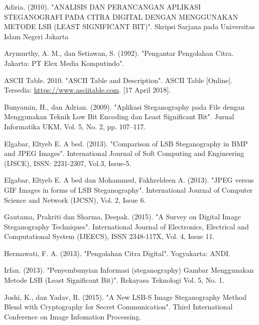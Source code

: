 \documentclass{jtetiskripsi}
\begin{document}
%
\begin{thebibliography}{99}
	Adiria. (2010). "ANALISIS DAN PERANCANGAN APLIKASI STEGANOGRAFI PADA CITRA DIGITAL DENGAN MENGGUNAKAN METODE LSB (LEAST SIGNIFICANT BIT)". Skripsi Sarjana pada Universitas Islam Negeri Jakarta
	
	Arymurthy, A. M., dan Setiawan, S. (1992). "Pengantar Pengolahan Citra. Jakarta: PT Elex Media Komputindo".
	
	 ASCII Table.  2010. "ASCII Table and Description".  ASCII Table [Online]. Tersedia: \url{https://www.asciitable.com}. [17 April 2018].
	
	Bunyamin, H., dan Adrian. (2009). "Aplikasi Steganography pada File dengan Menggunakan Teknik Low Bit Encoding dan Least Significant Bit". Jurnal Informatika UKM, Vol. 5, No. 2, pp. 107–117.
	
	Elgabar, Eltyeb E. A bed. (2013). "Comparison of LSB Steganography in BMP and JPEG Images". International Journal of Soft Computing and Engineering (IJSCE), ISSN: 2231-2307, Vol.3, Issue-5.
	
	Elgabar, Eltyeb E. A bed dan Mohammed, Fakhreldeen A. (2013). "JPEG versus GIF Images in forms of LSB Steganography".  International Journal of Computer Science and Network (IJCSN), Vol. 2, Issue 6.
	
	Gautama, Prakriti dan Sharma, Deepak. (2015). "A Survey on Digital Image Steganography Techniques". International Journal of Electronics, Electrical and Computational System (IJEECS), ISSN 2348-117X, Vol. 4, Issue 11. 
	
	Hermawati, F. A. (2013). "Pengolahan Citra Digital". Yogyakarta: ANDI.
	
	Irfan. (2013). "Penyembunyian Informasi (steganography) Gambar Menggunakan Metode LSB (Least Significant Bit)". Rekayasa Teknologi Vol. 5, No. 1.
	
	Joshi, K., dan Yadav, R. (2015). "A New LSB-S Image Steganography Method Blend with Cryptography for Secret Communication". Third International Conference on Image Infomation Processing.
	

\end{thebibliography}
\end{document}
